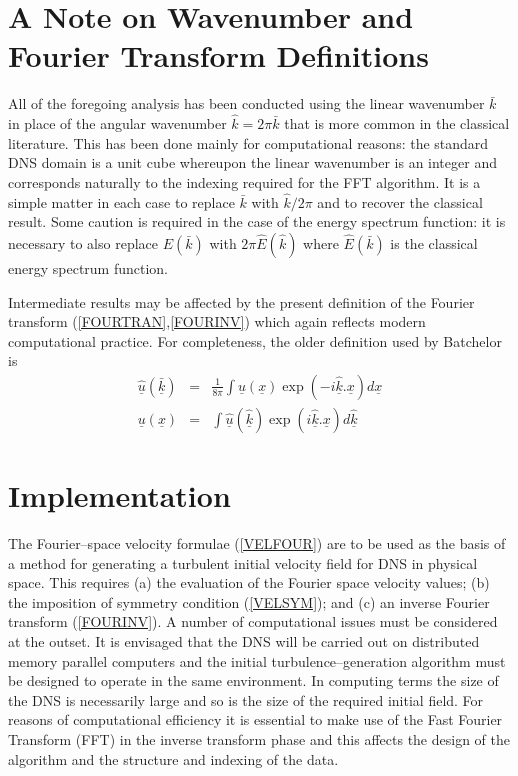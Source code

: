 \documentclass[dvips]{article}
\begin{document}
\section{A Note on Wavenumber and Fourier Transform Definitions}
All of the foregoing analysis has been conducted using the linear
wavenumber $\bar{k}$ in place of the angular wavenumber $\hat{k} = 2\pi
\bar{k}$ that is more common in the classical literature.  This has been
done mainly for computational reasons: the standard DNS domain is a unit cube
whereupon the linear wavenumber is an integer and corresponds naturally to the
indexing required for the FFT algorithm.  It is a simple matter in each
case to replace $\bar{k}$ with $\hat{k}/2\pi$ and to recover the classical
result.  Some caution is required in the case of the energy spectrum
function: it is necessary to also replace $E(\bar{k})$ with
$2\pi\hat{E}(\hat{k})$ where $\hat{E}(\bar{k})$ is the classical energy
spectrum function.

Intermediate results may be affected by the present definition of the
Fourier transform (\ref{FOURTRAN},\ref{FOURINV}) which again reflects modern
computational practice.  For completeness, the older definition used by
Batchelor \cite{batchelor53} is
\begin{eqnarray}
\underline{\hat{u}}(\underline{\bar{k}}) & = &
\frac{1}{8\pi}\int \underline{u}(\underline{x})
\exp{(-i\underline{\hat{k}}.\underline{x})} d\underline{x}
\nonumber\\
\underline{u}(\underline{x}) & = & \int
\underline{\hat{u}}(\underline{\hat{k}})
\exp{(i\underline{\hat{k}}.\underline{x})} d\underline{\hat{k}}
\end{eqnarray}
 
\section{Implementation}
The Fourier--space velocity formulae (\ref{VELFOUR}) are to be used as
the basis of a method for generating a turbulent initial velocity
field for DNS in physical space.  This requires (a) the evaluation of the
Fourier space velocity values;  (b) the imposition of symmetry condition
(\ref{VELSYM}); and (c) an inverse Fourier transform (\ref{FOURINV}).
A number of computational issues must be considered at the outset.  It
is envisaged that the DNS will be carried out on distributed memory
parallel computers and the initial turbulence--generation algorithm must
be designed to operate in the same environment.  In computing terms
the size of the DNS is necessarily large and so is the size of the
required initial field.
For reasons of computational efficiency it is essential to make use of
the Fast Fourier Transform (FFT) in the inverse transform phase
and this affects the design of the algorithm and the structure and indexing
of the data.
\end{document}
